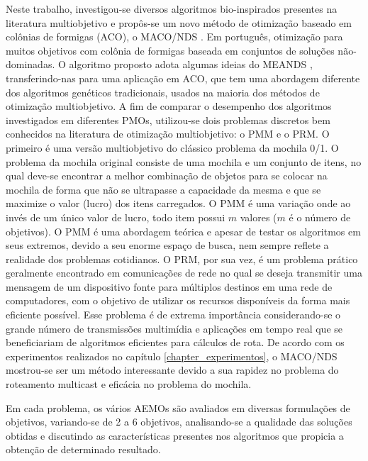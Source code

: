 Neste trabalho, investigou-se diversos algoritmos bio-inspirados presentes na literatura multiobjetivo e propôs-se um novo método de otimização baseado em colônias de formigas (ACO), o \ac{MACO/NDS} \cite{Franca2018}. Em português, otimização para muitos objetivos com colônia de formigas baseada em conjuntos de soluções não-dominadas. O algoritmo proposto adota algumas ideias do MEANDS \cite{Lafeta2017}, transferindo-nas para uma aplicação em ACO, que tem uma abordagem diferente dos algoritmos genéticos tradicionais, usados na maioria dos métodos de otimização multiobjetivo. A fim de comparar o desempenho dos algoritmos investigados em diferentes \acp{PMO}, utilizou-se dois problemas discretos bem conhecidos na literatura de otimização multiobjetivo: o \ac{PMM} e o \ac{PRM}. O primeiro é uma versão multiobjetivo do clássico problema da mochila 0/1. O problema da mochila original consiste de uma mochila e um conjunto de itens, no qual deve-se encontrar a melhor combinação de objetos para se colocar na mochila de forma que não se ultrapasse a capacidade da mesma e que se maximize o valor (lucro) dos itens carregados. O PMM é uma variação onde ao invés de um único valor de lucro, todo item possui $m$ valores ($m$ é o número de objetivos). O \ac{PMM} é uma abordagem teórica e apesar de testar os algoritmos em seus extremos, devido a seu enorme espaço de busca, nem sempre reflete a realidade dos problemas cotidianos. O \ac{PRM}, por sua vez, é um problema prático geralmente encontrado em comunicações de rede no qual se deseja transmitir uma mensagem de um dispositivo fonte para múltiplos destinos em uma rede de computadores, com o objetivo de utilizar os recursos disponíveis da forma mais eficiente possível. Esse problema é de extrema importância considerando-se o grande número de transmissões multimídia e aplicações em tempo real que se beneficiariam de algoritmos eficientes para cálculos de rota. De acordo com os experimentos realizados no capítulo \ref{chapter_experimentos}, o MACO/NDS mostrou-se ser um método interessante devido a sua rapidez no problema do roteamento multicast e eficácia no problema do mochila.

Em cada problema, os vários AEMOs são avaliados em diversas formulações de objetivos, variando-se de 2 a 6 objetivos, analisando-se a qualidade das soluções obtidas e discutindo as características presentes nos algoritmos que propicia a obtenção de determinado resultado. 

